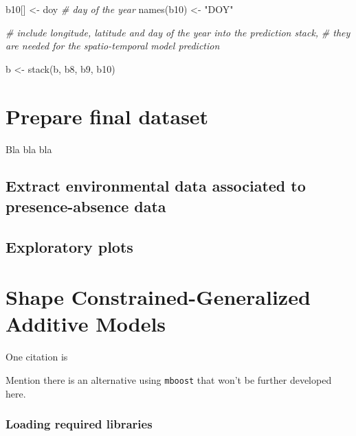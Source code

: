 \documentclass[
]{book}
\newenvironment{Shaded}{\begin{snugshade}}{\end{snugshade}}
\newcommand{\CommentTok}[1]{\textcolor[rgb]{0.56,0.35,0.01}{\textit{#1}}}
\newcommand{\FunctionTok}[1]{\textcolor[rgb]{0.00,0.00,0.00}{#1}}
\newcommand{\NormalTok}[1]{#1}
\newcommand{\OtherTok}[1]{\textcolor[rgb]{0.56,0.35,0.01}{#1}}
\newcommand{\StringTok}[1]{\textcolor[rgb]{0.31,0.60,0.02}{#1}}
\begin{document}
\begin{Shaded}
\begin{Highlighting}[]
\NormalTok{b10[] }\OtherTok{\textless{}{-}}\NormalTok{ doy }\CommentTok{\# day of the year}
\FunctionTok{names}\NormalTok{(b10) }\OtherTok{\textless{}{-}} \StringTok{"DOY"}

\CommentTok{\# include longitude, latitude and day of the year into the prediction stack, }
\CommentTok{\# they are needed for the spatio{-}temporal model prediction}

\NormalTok{b }\OtherTok{\textless{}{-}} \FunctionTok{stack}\NormalTok{(b, b8, b9, b10)}
\end{Highlighting}
\end{Shaded}

\hypertarget{prepare-final-dataset}{%
\chapter{Prepare final dataset}\label{prepare-final-dataset}}

Bla bla bla

\hypertarget{extract-environmental-data-associated-to-presence-absence-data}{%
\section{Extract environmental data associated to presence-absence data}\label{extract-environmental-data-associated-to-presence-absence-data}}

\hypertarget{exploratory-plots}{%
\section{Exploratory plots}\label{exploratory-plots}}

\hypertarget{shape-constrained-generalized-additive-models}{%
\chapter{Shape Constrained-Generalized Additive Models}\label{shape-constrained-generalized-additive-models}}

One citation is \citep{citores_etal_2020}

Mention there is an alternative using \texttt{mboost} that won't be further developed here.

\hypertarget{loading-required-libraries}{%
\subsection{Loading required libraries}\label{loading-required-libraries}}
\end{document}
